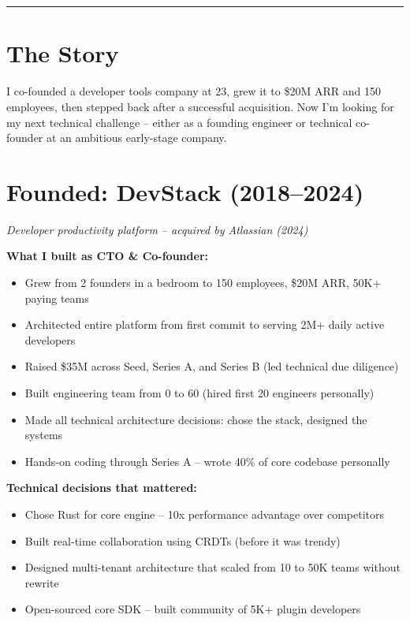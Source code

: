 \documentclass[11pt,letterpaper]{article}
\begin{document}
\\[4pt]
\\[8pt]

\vspace{8pt}
\noindent\rule{\linewidth}{2pt}

\section{The Story}

I co-founded a developer tools company at 23, grew it to \$20M ARR and 150 employees, then stepped back after a successful acquisition. Now I'm looking for my next technical challenge -- either as a founding engineer or technical co-founder at an ambitious early-stage company.

\section{Founded: DevStack (2018--2024)}

\textit{Developer productivity platform -- acquired by Atlassian (2024)}

\vspace{4pt}
\textbf{What I built as CTO \& Co-founder:}
\begin{itemize}
\item Grew from 2 founders in a bedroom to 150 employees, \$20M ARR, 50K+ paying teams
\item Architected entire platform from first commit to serving 2M+ daily active developers
\item Raised \$35M across Seed, Series A, and Series B (led technical due diligence)
\item Built engineering team from 0 to 60 (hired first 20 engineers personally)
\item Made all technical architecture decisions: chose the stack, designed the systems
\item Hands-on coding through Series A -- wrote 40\% of core codebase personally
\end{itemize}

\textbf{Technical decisions that mattered:}
\begin{itemize}
\item Chose Rust for core engine -- 10x performance advantage over competitors
\item Built real-time collaboration using CRDTs (before it was trendy)
\item Designed multi-tenant architecture that scaled from 10 to 50K teams without rewrite
\item Open-sourced core SDK -- built community of 5K+ plugin developers
\end{itemize}
\end{document}
